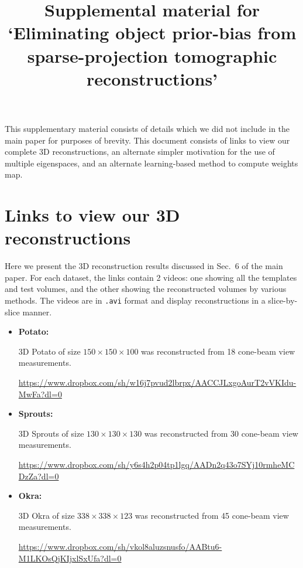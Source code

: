 \documentclass{article}
\title{Supplemental material for `Eliminating object prior-bias from sparse-projection
tomographic reconstructions'}
\begin{document}
\date{}
\maketitle
This supplementary material consists of details which we did not
include in the main paper for purposes of brevity. This document
consists of links to view our complete 3D reconstructions, an
alternate simpler motivation for the use of multiple eigenspaces, and an
alternate learning-based method to compute weights map. %

\tableofcontents


\section{Links to view our 3D reconstructions}
Here we present the 3D reconstruction results discussed in Sec.~6 of
the main paper. For each dataset, the links contain 2 videos: one
showing all the templates and test volumes, and the other showing the
reconstructed volumes by various methods. The videos are in
\verb+.avi+ format and display reconstructions in a slice-by-slice
manner.

\begin{itemize}

\item \textbf{Potato:} 

    3D Potato of size $150\times 150\times 100$ was reconstructed from 18 cone-beam view measurements.

  \url{https://www.dropbox.com/sh/w16j7pvud2lbrpx/AACCJLxgoAurT2vVKIdu-MwFa?dl=0}
\item \textbf{Sprouts:}
 
    3D Sprouts of size $130\times 130\times 130$ was reconstructed from 30 cone-beam view measurements.

    \url{https://www.dropbox.com/sh/y6s4h2p04tp1lgq/AADn2q43o7SYj10rmheMCDzZa?dl=0}

  \item \textbf{Okra:}

  3D Okra of size $338\times 338\times 123$ was reconstructed from 45 cone-beam view measurements.

  \url{https://www.dropbox.com/sh/vkol8aluzsnusfo/AABtu6-M1LKOsQjKIjxlSxUfa?dl=0}
\end{itemize}
\end{document}
